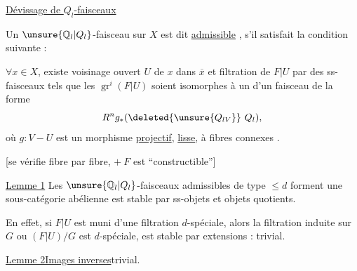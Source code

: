 \uline{Dévissage de \(Q_l\)-faisceaux}


Un \(\unsure{\mathbb Q_l|Q_l}\)-faisceau   sur \(X\) est dit
\uline{admissible} , s'il satisfait la condition suivante :

\(\forall x\in X\), existe voisinage ouvert \(U\) de \(x\) dans \(\overline{x}\)
et filtration  de \(F|U\) par des ss-faisceaux
tels que les \(\operatorname{gr}^i(F|U)\) soient isomorphes
à un 
d'un faisceau de la forme
\[
R^ng_*(\deleted{\unsure{Q_{lV}}}\ Q_l),
\]
où \(g:V\mathbin{-}U\) est un morphisme \uline{projectif},
 \uline{lisse}, à fibres connexes .


[se vérifie fibre par fibre, \(+\ F\) est ``constructible'']


\uline{Lemme 1}\quad
Les  \(\unsure{\mathbb Q_l|Q_l}\)-faisceaux admissibles de type \(\le d\)
forment une sous-catégorie abélienne
est stable par ss-objets et objets quotients.

En effet, si \(F|U\) est muni d'une filtration \(d\)-spéciale,
alors la filtration induite sur \(G\) ou \((F|U)/G\) est \(d\)-spéciale,
est stable par extensions : trivial.

\uline{Lemme 2}\quad \uline{Images inverses}\hfill trivial.
